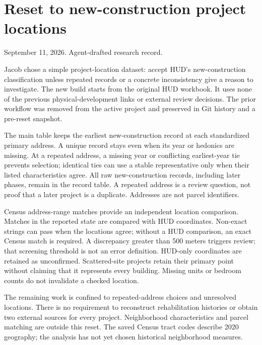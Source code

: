 \documentclass[11pt]{article}
\begin{document}
\section*{Reset to new-construction project locations}
\noindent September 11, 2026. Agent-drafted research record.

Jacob chose a simple project-location dataset: accept HUD's new-construction
classification unless repeated records or a concrete inconsistency give a reason
to investigate. The new build starts from the original HUD workbook. It uses none
of the previous physical-development links or external review decisions. The prior
workflow was removed from the active project and preserved in Git history and a
pre-reset snapshot.

\begin{center}
\small

\end{center}

The main table keeps the earliest new-construction record at each standardized
primary address. A unique record stays even when its year or hedonics are missing.
At a repeated address, a missing year or conflicting earliest-year tie prevents
selection; identical ties can use a stable representative only when their listed
characteristics agree. All raw new-construction records, including later phases,
remain in the record table. A repeated address is a review question, not proof
that a later project is a duplicate. Addresses are not parcel identifiers.

Census address-range matches provide an independent location comparison. Matches in the reported state are compared with HUD coordinates.
Non-exact strings can pass when the locations agree; without a HUD comparison,
an exact Census match is required. A discrepancy
greater than 500 meters triggers review; that screening threshold is not an error
definition. HUD-only coordinates are retained as unconfirmed. Scattered-site
projects retain their primary point without claiming that it represents every
building. Missing units or bedroom counts do not invalidate a checked location.

The remaining work is confined to repeated-address choices and unresolved
locations. There is no requirement to reconstruct rehabilitation histories or
obtain two external sources for every project. Neighborhood characteristics and
parcel matching are outside this reset. The saved Census tract codes describe
2020 geography; the analysis has not yet chosen historical neighborhood measures.
\end{document}
